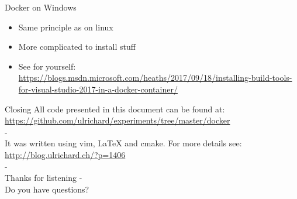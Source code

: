 \documentclass[11pt]{beamer}
\begin{document}
\begin{frame}{Docker on Windows} 
\begin{itemize}
\item Same principle as on linux
\item More complicated to install stuff
\item See for yourself: \url{https://blogs.msdn.microsoft.com/heaths/2017/09/18/installing-build-tools-for-visual-studio-2017-in-a-docker-container/}
\end{itemize}
\end{frame}

\begin{frame}{Closing}
All code presented in this document can be found at:\\
\url{https://github.com/ulrichard/experiments/tree/master/docker}\\
-\\
It was written using vim, LaTeX and cmake. For more details see:\\
\url{http://blog.ulrichard.ch/?p=1406}\\
-\\
Thanks for listening
-\\
Do you have questions?
\end{frame}
\end{document}
